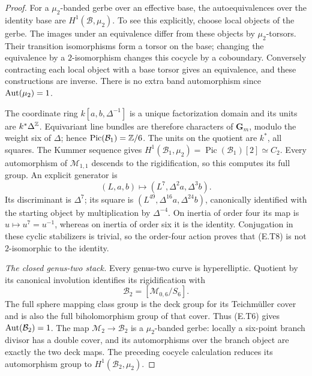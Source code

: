 \begin{proof}
For a $\mu_2$-banded gerbe over an effective base, the
autoequivalences over the identity base are
$H^1(\mathcal B,\mu_2)$.  To see this explicitly, choose
local objects of the gerbe.  The images under an
equivalence differ from these objects by $\mu_2$-torsors.
Their transition isomorphisms form a torsor on the base;
changing the equivalence by a $2$-isomorphism changes this
cocycle by a coboundary.  Conversely contracting each local
object with a base torsor gives an equivalence, and these
constructions are inverse.  There is no extra band
automorphism since $\operatorname{Aut}(\mu_2)=1$.

The coordinate ring $k[a,b,\Delta^{-1}]$ is a unique
factorization domain and its units are $k^*\Delta^{\mathbb Z}$.
Equivariant line bundles are therefore characters of
$\mathbf G_m$, modulo the weight six of $\Delta$; hence
$\operatorname{Pic}(\mathcal B_1)=\mathbb Z/6$.
The units on the quotient are $k^*$, all squares.
The Kummer sequence gives
$H^1(\mathcal B_1,\mu_2)=\operatorname{Pic}(\mathcal B_1)[2]
\simeq C_2$.  Every automorphism of $\mathcal M_{1,1}$
descends to the rigidification, so this computes its full
group.  An explicit generator is
\[
       (L,a,b)\longmapsto
       (L^7,\Delta^2a,\Delta^3b).
 \tag{E.T8}
\]
Its discriminant is $\Delta^7$; its square is
$(L^{49},\Delta^{16}a,\Delta^{24}b)$, canonically identified
with the starting object by multiplication by $\Delta^{-4}$.
On inertia of order four its map is $u\mapsto u^7=u^{-1}$,
whereas on inertia of order six it is the identity.
Conjugation in these cyclic stabilizers is trivial, so the
order-four action proves that (E.T8) is not $2$-isomorphic
to the identity.

\emph{The closed genus-two stack.}
Every genus-two curve is hyperelliptic.  Quotient by its
canonical involution identifies its rigidification with
\[
          \mathcal B_2=[\mathcal M_{0,6}/S_6].
\]
The full sphere mapping class group is the deck group for
its Teichm\"uller cover and is also the full biholomorphism
group of that cover.  Thus (E.T6) gives
$\operatorname{Aut}(\mathcal B_2)=1$.  The map
$\mathcal M_2\to\mathcal B_2$ is a $\mu_2$-banded gerbe:
locally a six-point branch divisor has a double cover,
and its automorphisms over the branch object are exactly
the two deck maps.  The preceding cocycle calculation
reduces its automorphism group to
$H^1(\mathcal B_2,\mu_2)$.


\end{proof}
